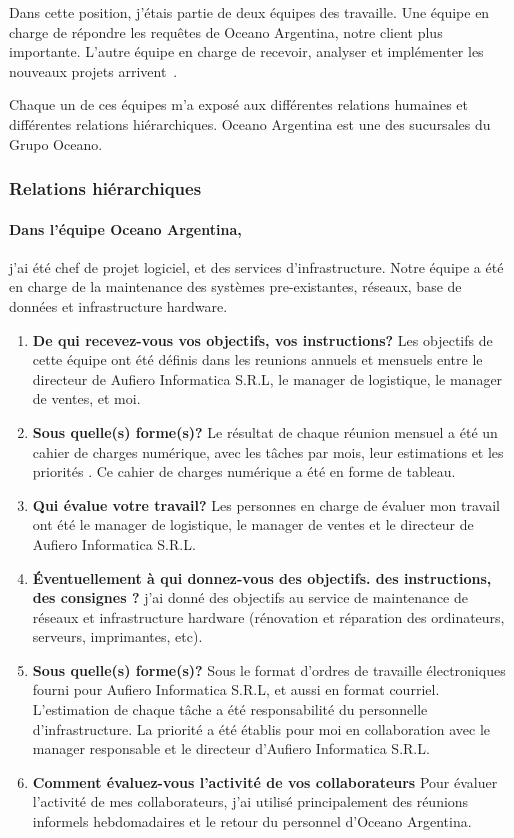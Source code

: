 \documentclass{resume} %
\begin{document}
Dans cette position, j'étais partie de deux équipes des travaille. Une équipe en charge de répondre les requêtes de Oceano Argentina,  notre client plus importante. 
L'autre équipe en charge de recevoir, analyser et implémenter les nouveaux projets arrivent~. 

Chaque un de ces équipes m'a exposé aux différentes relations humaines et différentes relations hiérarchiques.  
Oceano Argentina est une des sucursales du Grupo Oceano. 

	
	\subsubsection{Relations hiérarchiques} 
	

		\paragraph{Dans l'équipe Oceano Argentina,} j'ai été chef de projet logiciel, et des services d'infrastructure.  Notre équipe a été en charge de la maintenance des systèmes pre-existantes, réseaux, base de données et infrastructure hardware. 
		
		\begin{enumerate}
		\item \textbf{De qui recevez-vous vos objectifs, vos instructions?}
			Les objectifs de cette équipe ont été définis dans les reunions annuels et mensuels entre le directeur de Aufiero Informatica S.R.L, le manager de logistique, le manager de ventes, et moi.
		\item \textbf{Sous quelle(s) forme(s)?}
			Le résultat de chaque réunion mensuel a été un cahier de charges numérique, avec les tâches par mois, leur estimations et les priorités . Ce cahier de charges numérique  a été en forme de tableau.
		\item \textbf{Qui évalue votre travail?}
			Les personnes en charge de évaluer mon travail ont été  le manager de logistique, le manager de ventes et le directeur de Aufiero Informatica S.R.L. 
		\item  \textbf{Éventuellement à qui donnez-vous des objectifs. des instructions, des consignes ?}
			j'ai donné des objectifs au service de maintenance de réseaux et infrastructure hardware (rénovation et réparation des ordinateurs, serveurs, imprimantes, etc).
		\item \textbf{Sous quelle(s) forme(s)?}
			Sous le format d'ordres de travaille électroniques fourni pour Aufiero Informatica S.R.L, et aussi en format courriel. L'estimation de chaque tâche a été responsabilité du personnelle d'infrastructure. 
			La priorité a été établis pour moi en collaboration avec le manager responsable et le directeur d'Aufiero Informatica S.R.L.  
		\item \textbf{Comment évaluez-vous l'activité de vos collaborateurs}
			Pour évaluer l'activité de mes collaborateurs, j'ai utilisé principalement des réunions informels hebdomadaires et le retour du personnel d'Oceano Argentina. 
		\end{enumerate}
		
\end{document}
